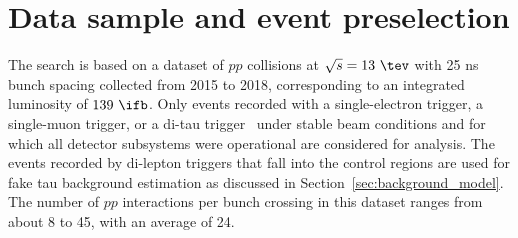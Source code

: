\section{Data sample and event preselection}
\label{sec:data_presel}

The search is based on a dataset of $pp$ collisions at $\sqrt{s}=13~\tev$ with 25 ns bunch spacing collected from 2015 to 2018, corresponding to an integrated luminosity of $139~\ifb$.
Only events recorded with a single-electron trigger, a single-muon trigger, or a di-tau trigger~\cite{TRIG-2018-05,TRIG-2018-01,id_trigger,l1topo_trigger} under stable beam conditions 
and for which all detector subsystems were operational are considered for analysis. The events recorded by di-lepton triggers that fall into the control regions are used for fake tau background
estimation as discussed in Section~\ref{sec:background_model}. The number of $pp$ interactions per bunch crossing in this dataset ranges from about 8 to 45, with an average of 24.

